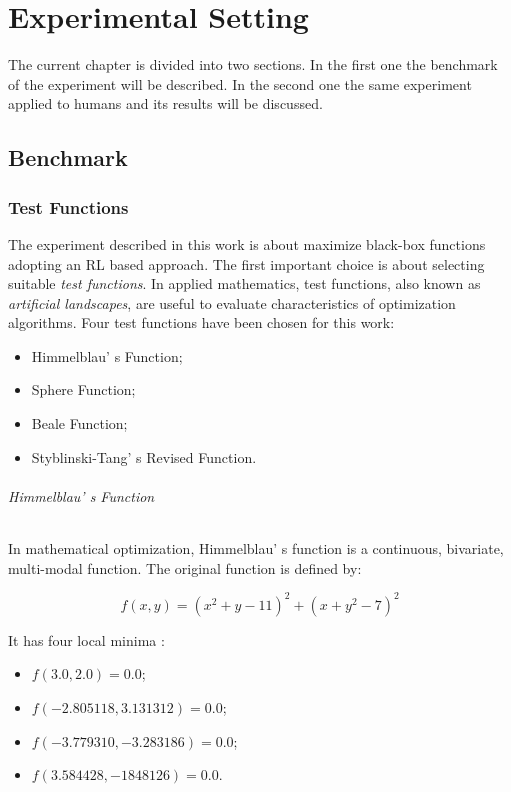 \chapter{Experimental Setting}

The current chapter is divided into two sections. In the first one the benchmark of the experiment will be described. In the second one the same experiment applied to humans and its results will be discussed.

\section{Benchmark}

\subsection{Test Functions}

The experiment described in this work is about maximize black-box functions adopting an RL based approach. The first important choice is about selecting suitable \textit{test functions}. In applied mathematics, test functions, also known as \textit{artificial landscapes}, are useful to evaluate characteristics of optimization algorithms. Four test functions have been chosen for this work:

\begin{itemize}
	\item Himmelblau' s Function;
	\item Sphere Function;
	\item Beale Function;
	\item Styblinski-Tang' s Revised Function.	
\end{itemize}

\subparagraph{Himmelblau' s Function} In mathematical optimization, Himmelblau' s function is a continuous, bivariate, multi-modal function. The original function is defined by: 

\begin{equation}
	f(x, y) = (x^2 + y -11)^2 + (x + y^2 - 7)^2
\end{equation}

It has four local minima :

\begin{itemize}
	\item $f(3.0, 2.0) = 0.0$;
	\item $f(-2.805118, 3.131312) = 0.0$;
	\item $f(-3.779310, -3.283186) = 0.0$;
	\item $f(3.584428, -1848126) = 0.0$.
\end{itemize}
	
